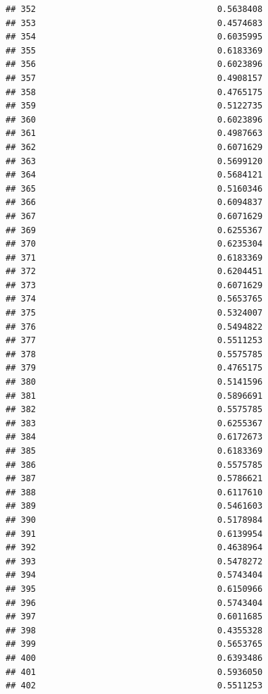 \documentclass[
  american,
  man,floatsintext]{apa7}
\begin{document}
\begin{verbatim}
## 352                                    0.5638408
## 353                                    0.4574683
## 354                                    0.6035995
## 355                                    0.6183369
## 356                                    0.6023896
## 357                                    0.4908157
## 358                                    0.4765175
## 359                                    0.5122735
## 360                                    0.6023896
## 361                                    0.4987663
## 362                                    0.6071629
## 363                                    0.5699120
## 364                                    0.5684121
## 365                                    0.5160346
## 366                                    0.6094837
## 367                                    0.6071629
## 369                                    0.6255367
## 370                                    0.6235304
## 371                                    0.6183369
## 372                                    0.6204451
## 373                                    0.6071629
## 374                                    0.5653765
## 375                                    0.5324007
## 376                                    0.5494822
## 377                                    0.5511253
## 378                                    0.5575785
## 379                                    0.4765175
## 380                                    0.5141596
## 381                                    0.5896691
## 382                                    0.5575785
## 383                                    0.6255367
## 384                                    0.6172673
## 385                                    0.6183369
## 386                                    0.5575785
## 387                                    0.5786621
## 388                                    0.6117610
## 389                                    0.5461603
## 390                                    0.5178984
## 391                                    0.6139954
## 392                                    0.4638964
## 393                                    0.5478272
## 394                                    0.5743404
## 395                                    0.6150966
## 396                                    0.5743404
## 397                                    0.6011685
## 398                                    0.4355328
## 399                                    0.5653765
## 400                                    0.6393486
## 401                                    0.5936050
## 402                                    0.5511253

\end{verbatim}
\end{document}
